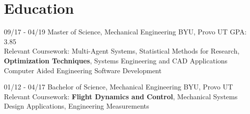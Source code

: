 \documentclass[]{friggeri-cv}
\begin{document}
\section{Education}
\vspace{-3mm}
\begin{entrylist}
    \entry
    {09/17 - 04/19}
    {Master of Science, Mechanical Engineering}
    {BYU, Provo UT}
    {GPA: 3.85\\Relevant Coursework: Multi-Agent Systems, Statistical Methods for Research, \textbf{Optimization Techniques}, Systems Engineering and CAD Applications Computer Aided Engineering Software Development}

    \entry
    {01/12 - 04/17}
    {Bachelor of Science, Mechanical Engineering}
    {BYU, Provo UT}
    {Relevant Coursework: \textbf{Flight Dynamics and Control}, Mechanical Systems Design Applications, Engineering Measurements}



\end{entrylist}



\vspace{-4mm}
\end{document}
